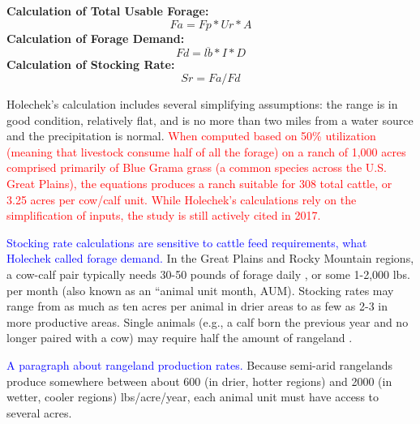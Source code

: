 \documentclass[11pt]{article}
\begin{document}
\textbf{Calculation of Total Usable Forage:}
\begin{equation}
Fa= Fp * Ur * A
\end{equation}
\textbf{Calculation of Forage Demand:}
\begin{equation}
Fd = \overline{lb} * I * D
\end{equation}
\textbf{Calculation of Stocking Rate:}
\begin{equation}
Sr = Fa / Fd
\end{equation}


Holechek’s calculation includes several simplifying assumptions: the range is in good condition, relatively flat, and is no more than two miles from a water source and the precipitation is normal. 
\textcolor{red}{ When computed based on 50\% utilization (meaning that livestock consume half of all the forage)
 on a ranch of 1,000 acres comprised primarily of Blue Grama grass (a common species across the U.S. Great Plains), the equations produces a ranch suitable for 308 total cattle, or 3.25 acres per cow/calf unit. While Holechek’s calculations rely on the simplification of inputs, the study is still actively cited in 2017.}

\textcolor{blue}{Stocking rate calculations are sensitive to cattle feed requirements, what Holechek called forage demand.} In the Great Plains and Rocky Mountain regions, a cow-calf pair typically needs 30-50 pounds of forage daily \citep{Cook2012}, or some 1-2,000 lbs. per month (also known as an “animal unit month, AUM).
Stocking rates may range from as much as ten acres per animal in drier areas to as few as 2-3 in more productive areas. Single animals (e.g., a calf born the previous year and no longer paired with a cow) may require half the amount of rangeland \citep{Bement1969}. 


\textcolor{blue}{A paragraph about rangeland production rates.}
Because semi-arid rangelands produce somewhere between about 600 (in drier, hotter regions) and 2000 (in wetter, cooler regions) lbs/acre/year, each animal unit must have access to several acres. 
\end{document}

